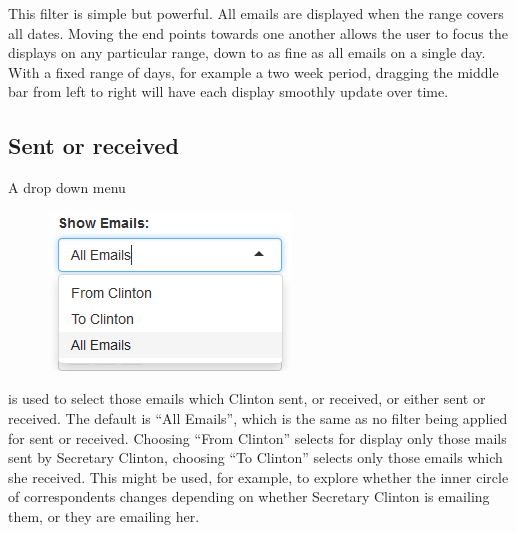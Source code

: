 \documentclass[journal]{vgtc}                %
\begin{document}
This filter is simple but powerful.  All emails are displayed when the range covers all dates.  Moving the end points towards one another allows the user to focus the displays on any particular range, down to as fine as all emails on a single day.  With a fixed range of days, for example a two week period,  dragging the middle bar from left to right will have each display smoothly update over time.
%
\subsection{Sent or received}
A drop down menu 
\begin{figure}[h]
\begin{center}
\includegraphics[width=0.35\linewidth]{ToFromImage}
\end{center}
\end{figure}
is used to select those emails which Clinton sent, or received, or either sent or received.  The default is ``All Emails'', which is the same as no filter being applied for sent or received.  Choosing ``From Clinton'' selects for display only those mails sent by Secretary Clinton, choosing ``To  Clinton'' selects only those emails which she received.  This might be used, for example, to explore whether the inner circle of correspondents changes depending on whether Secretary Clinton is emailing them, or they are emailing her.
\end{document}
